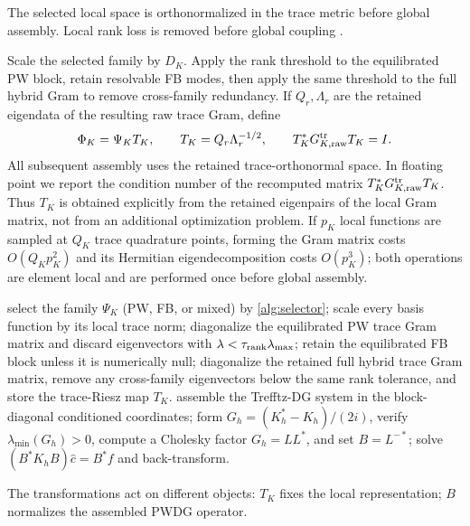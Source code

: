 \documentclass[11pt]{article}
\newcommand{\ii}{i}
\numberwithin{equation}{section}
\begin{document}
The selected local space is orthonormalized in the trace metric before global assembly.
Local rank loss is removed before global coupling \citep{HuttunenMonkKaipio2002,CongreveGedickePerugia2019,BarucqEtAl2021}.

Scale the selected family by $D_K$.  Apply the rank threshold to the equilibrated PW block, retain resolvable FB modes, then apply the same threshold to the full hybrid Gram to remove cross-family redundancy.  If $Q_r,\Lambda_r$ are the retained eigendata of the resulting raw trace Gram, define
\begin{equation}\label{eq:local-trace-riesz}
 \Phi_K=\Psi_KT_K,\qquad
 T_K=Q_r\Lambda_r^{-1/2},\qquad
 T_K^*G_{K,\rm raw}^{\rm tr}T_K=I.
\end{equation}
All subsequent assembly uses the retained trace-orthonormal space.  In floating point we report the condition number of the recomputed matrix $T_K^*G_{K,\rm raw}^{\rm tr}T_K$.  Thus $T_K$ is obtained explicitly from the retained eigenpairs of the local Gram matrix, not from an additional optimization problem.  If $p_K$ local functions are sampled at $Q_K$ trace quadrature points, forming the Gram matrix costs $O(Q_Kp_K^2)$ and its Hermitian eigendecomposition costs $O(p_K^3)$; both operations are element local and are performed once before global assembly.

\begin{algorithm}[t]
\caption{Local conditioning and global graph--Riesz solve}\label{alg:conditioned-solve}
\begin{algorithmic}[1]
  \State select the family $\Psi_K$ (PW, FB, or mixed) by \cref{alg:selector};
  \State scale every basis function by its local trace norm;
  \State diagonalize the equilibrated PW trace Gram matrix and discard eigenvectors with $\lambda<\tau_{\rm rank}\lambda_{\max}$;
  \State retain the equilibrated FB block unless it is numerically null;
  \State diagonalize the retained full hybrid trace Gram matrix, remove any cross-family eigenvectors below the same rank tolerance, and store the trace-Riesz map $T_K$.
\EndFor
\State assemble the Trefftz-DG system in the block-diagonal conditioned coordinates;
\State form $G_h=(K_h^*-K_h)/(2\ii)$, verify $\lambda_{\min}(G_h)>0$, compute a Cholesky factor $G_h=LL^*$, and set $B=L^{-*}$;
\State solve $(B^*K_hB)\widehat c=B^*f$ and back-transform.
\end{algorithmic}
\end{algorithm}

The transformations act on different objects: $T_K$ fixes the local representation; $B$ normalizes the assembled PWDG operator.
\end{document}
